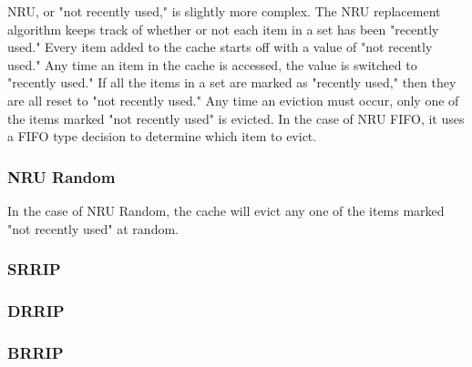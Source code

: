 NRU, or "not recently used," is slightly more complex.  The NRU replacement algorithm keeps track of whether or not each item in a set has been "recently used."  Every item added to the cache starts off with a value of "not recently used."  Any time an item in the cache is accessed, the value is switched to "recently used."  If all the items in a set are marked as "recently used," then they are all reset to "not recently used."  Any time an eviction must occur, only one of the items marked "not recently used" is evicted.  In the case of NRU FIFO, it uses a FIFO type decision to determine which item to evict.

\subsubsection{NRU Random}

In the case of NRU Random, the cache will evict any one of the items marked "not recently used" at random.

\subsubsection{SRRIP}



\subsubsection{DRRIP}



\subsubsection{BRRIP}


